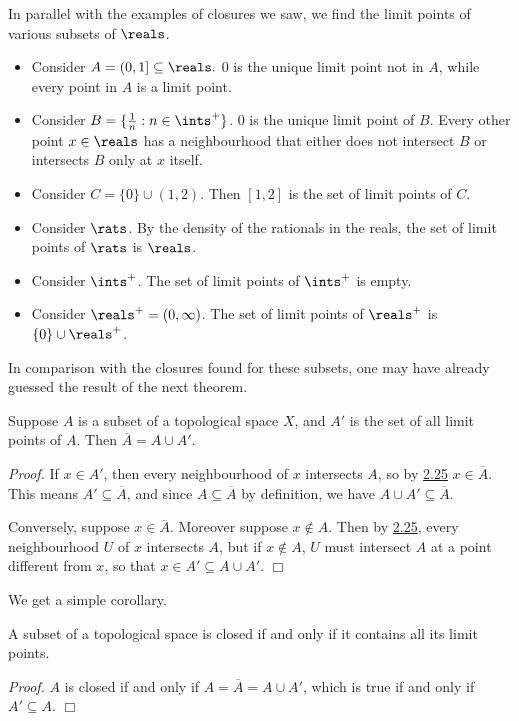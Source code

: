 In parallel with the examples of closures we saw, we find the limit points of various subsets of $\reals$.
\begin{itemize}
    \item Consider $A = (0, 1] \subseteq \reals.$ $0$ is the unique limit point not in $A$, while every point in $A$ is a limit point.
    \item Consider $B = \{\frac1n : n \in \ints^+\}$. $0$ is the unique limit point of $B$. Every other point $x \in \reals$ has a neighbourhood that either does not intersect $B$ or intersects $B$ only at $x$ itself.
    \item Consider $C = \{0\} \cup (1, 2)$. Then $[1, 2]$ is the set of limit points of $C$.
    \item Consider $\rats$. By the density of the rationals in the reals, the set of limit points of $\rats$ is $\reals$.
    \item Consider $\ints^+$. The set of limit points of $\ints^+$ is empty.
    \item Consider $\reals^+ = (0, \infty)$. The set of limit points of $\reals^+$ is $\{0\} \cup \reals^+$.
\end{itemize}
In comparison with the closures found for these subsets, one may have already guessed the result of the next theorem.
\begin{theorem}\label{2.27}
    Suppose $A$ is a subset of a topological space $X$, and $A'$ is the set of all limit points of $A$. Then $\overline{A} = A \cup A'$.
\end{theorem}
{\it Proof.} If $x \in A'$, then every neighbourhood of $x$ intersects $A$, so by \hyperref[2.25]{2.25} $x \in \overline{A}$. This means $A' \subseteq \overline{A}$, and since $A \subseteq \overline{A}$ by definition, we have $A \cup A' \subseteq \overline{A}$.

Conversely, suppose $x \in \overline{A}$. Moreover suppose $x \notin A$. Then by \hyperref[2.25]{2.25}, every neighbourhood $U$ of $x$ intersects $A$, but if $x \notin A$, $U$ must intersect $A$ at a point different from $x$, so that $x \in A' \subseteq A \cup A'$. $\Box$

We get a simple corollary.
\begin{corollary}\label{2.28}
    A subset of a topological space is closed if and only if it contains all its limit points.
\end{corollary}
{\it Proof.} $A$ is closed if and only if $A = \overline{A} = A \cup A'$, which is true if and only if $A' \subseteq A$. $\Box$

